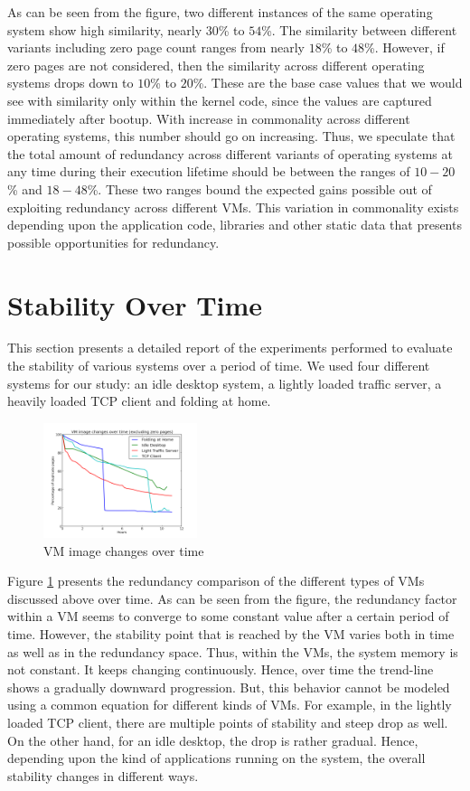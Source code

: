 \documentclass{acm_proc_article-sp}
\begin{document}
As can be seen from the figure, two different instances of the same operating system show high similarity, nearly $30$\% to $54$\%. The similarity between different variants including zero page count ranges from nearly $18$\% to $48$\%. However, if zero pages are not considered, then the similarity across different operating systems drops down to $10$\% to $20$\%. These are the base case values that we would see with similarity only within the kernel code, since the values are captured immediately after bootup. With increase in commonality across different operating systems, this number should go on increasing. Thus, we speculate that the total amount of redundancy across different variants of operating systems at any time during their execution lifetime should be between the ranges of $10-20$\% and $18-48$\%. These two ranges bound the expected gains possible out of exploiting redundancy across different VMs. This variation in commonality exists depending upon the application code, libraries and other static data that presents possible opportunities for redundancy.

\section{Stability Over Time}
This section presents a detailed report of the experiments performed to evaluate the stability of various systems over a period of time. We used four different systems for our study: an idle desktop system, a lightly loaded traffic server, a heavily loaded TCP client and folding at home.


\begin{figure}
  \centering
  \includegraphics[width=0.4\textwidth]{images/vm_vs_time.png}
  \caption{VM image changes over time}\label{fig:vm_vs_time}
\end{figure}

Figure \ref{fig:vm_vs_time} presents the redundancy comparison of the different types of VMs discussed above over time. As can be seen from the figure, the redundancy factor within a VM seems to converge to some constant value after a certain period of time. However, the stability point that is reached by the VM varies both in time as well as in the redundancy space. Thus, within the VMs, the system memory is not constant. It keeps changing continuously. Hence, over time the trend-line shows a gradually downward progression. But, this behavior cannot be modeled using a common equation for different kinds of VMs. For example, in the lightly loaded TCP client, there are multiple points of stability and steep drop as well. On the other hand, for an idle desktop, the drop is rather gradual. Hence, depending upon the kind of applications running on the system, the overall stability changes in different ways.
\end{document}
